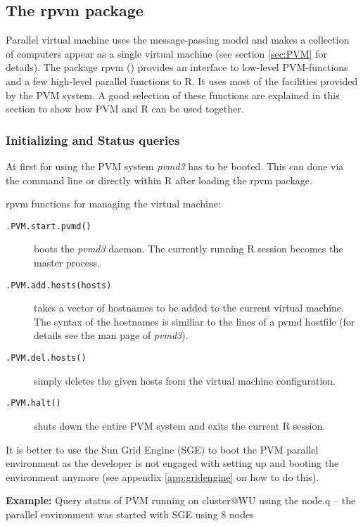 \subsection{The rpvm package}
\label{sec:rpvm}
Parallel virtual machine uses the message-passing model and makes a
collection of computers appear as a single virtual machine (see section
\ref{sec:PVM} for details).
The package rpvm (\cite{nali07rpvm}) provides an interface to
low-level PVM-functions and
a few high-level parallel functions to R. It uses most of the
facilities provided by the PVM system. A good selection of these
functions are explained in this section to show how PVM and R can be
used together.

\subsubsection{Initializing and Status queries}

At first for using the PVM system \textit{pvmd3} has to be
booted. This can done via the command
line or directly within R after loading the rpvm package.


rpvm functions for managing the virtual machine:

\begin{description}
\item[\texttt{.PVM.start.pvmd()}] boots the \textit{pvmd3} daemon. The
  currently running R session becomes the master process. 
\item[\texttt{.PVM.add.hosts(hosts)}] takes a vector of hostnames to
  be added to the current virtual machine. The syntax of the
  hostnames is similiar to the lines of a pvmd hostfile (for details
  see the man page of \textit{pvmd3}). 
\item[\texttt{.PVM.del.hosts()}] simply deletes the given hosts from
  the virtual machine configuration.
\item[\texttt{.PVM.halt()}] shuts down the entire PVM system and exits
  the current R session.
\end{description}
  
It is better to use the Sun Grid Engine (SGE) to boot the PVM parallel
environment as the developer is not engaged with
setting up and booting the environment anymore (see
appendix \ref{app:gridengine} on how to do this).


\textbf{Example:} Query status of PVM \newline
running on cluster@WU using the node.q -- the parallel environment was
started with SGE using 8 nodes

